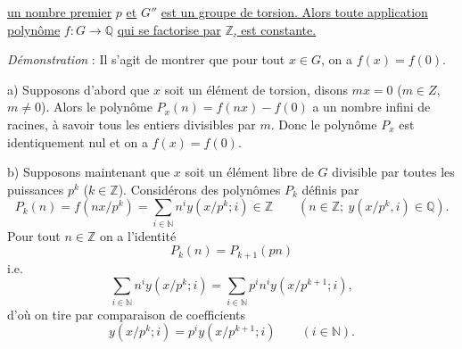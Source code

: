 
\uline{un nombre premier} $p$ \uline{et} $G''$ \uline{est un groupe de torsion. Alors toute application polynôme} $f:G\to\mathbb Q$ \uline{qui se factorise par} $\mathbb Z$\uline{, est constante.}

\emph{Démonstration} : Il s'agit de montrer que pour tout $x\in G$, on a $f(x)=f(0)$.

a) Supposons d'abord que $x$ soit un élément de torsion, disons $mx=0$ ($m\in Z$, $m\ne0$). Alors le polynôme $P_x(n)=f(nx)-f(0)$ a un nombre infini de racines, à savoir tous les entiers divisibles par $m$. Donc le polynôme $P_x$ est identiquement nul et on a $f(x)=f(0)$.

b) Supposons maintenant que $x$ soit un élément libre de $G$ divisible par toutes les puissances $p^k$ ($k\in\mathbb Z$). Considérons des polynômes $P_k$ définis par
\[
P_k(n)=f(nx/p^k)=\sum_{i\in\mathbb N}n^iy(x/p^k;i)\in\mathbb Z
\qquad(n\in\mathbb Z;\ y(x/p^k,i)\in\mathbb Q).
\]
Pour tout $n\in\mathbb Z$ on a l'identité
\[
P_k(n)=P_{k+1}(pn)
\]
i.e.
\[
\sum_{i\in\mathbb N}n^iy(x/p^k;i)=\sum_{i\in\mathbb N}p^in^iy(x/p^{k+1};i),
\]
d'où on tire par comparaison de coefficients
\[
y(x/p^k;i)=p^iy(x/p^{k+1};i)\qquad(i\in\mathbb N).
\]
